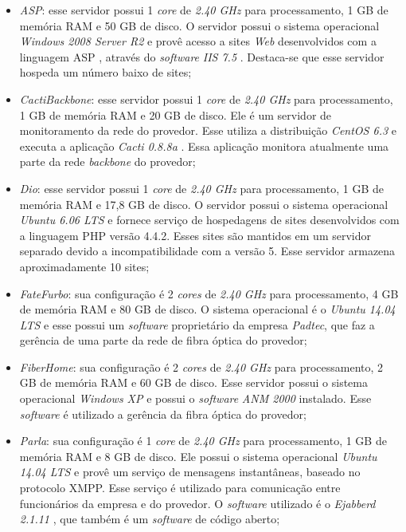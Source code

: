 \begin{itemize}
 \item \textit{ASP}: esse servidor possui 1 \textit{core} de \textit{2.40 GHz} para processamento, 1 GB de memória RAM e 50 GB de disco. 
 O servidor possui o sistema operacional \textit{Windows 2008 Server R2} e provê acesso a sites \textit{Web} desenvolvidos com a linguagem 
 \ac{ASP} \cite{asp}, através do \textit{software} \textit{\ac{IIS} 7.5} \cite{iis}. Destaca-se que esse servidor hospeda um número baixo de sites;
 
 \item \textit{CactiBackbone}: esse servidor possui 1 \textit{core} de \textit{2.40 GHz} para processamento, 1 GB de memória RAM e 20 GB de disco. 
 Ele é um servidor de monitoramento da rede do provedor. Esse utiliza a distribuição \textit{CentOS 6.3} \cite{centos} e executa a aplicação 
 \textit{Cacti 0.8.8a} \cite{cacti}. Essa aplicação monitora atualmente uma parte da rede \textit{backbone} do provedor;
 
 \item \textit{Dio}: esse servidor possui 1 \textit{core} de \textit{2.40 GHz} para processamento, 1 GB de memória RAM e 17,8 GB de disco. 
 O servidor possui o sistema operacional \textit{Ubuntu 6.06 \ac{LTS}} \cite{ubuntu} e fornece serviço de hospedagens de sites desenvolvidos com 
 a linguagem \ac{PHP} versão 4.4.2. Esses sites são mantidos em um servidor separado devido a incompatibilidade com a versão 5. Esse servidor 
 armazena aproximadamente 10 sites;
 
 \item \textit{FateFurbo}: sua configuração é 2 \textit{cores} de \textit{2.40 GHz} para processamento, 4 GB de memória RAM e 80 GB de disco. 
 O sistema operacional é o \textit{Ubuntu 14.04 \ac{LTS}} \cite{ubuntu} e esse possui um \textit{software} proprietário da empresa \textit{Padtec}, 
 que faz a gerência de uma parte da rede de fibra óptica do provedor;
 
 \item \textit{FiberHome}: sua configuração é 2 \textit{cores} de \textit{2.40 GHz} para processamento, 2 GB de memória RAM e 60 GB de disco. 
 Esse servidor possui o sistema operacional \textit{Windows XP} e possui o \textit{software} \textit{ANM 2000} instalado. Esse \textit{software} 
 é utilizado a gerência da fibra óptica do provedor;
 
 \item \textit{Parla}: sua configuração é 1 \textit{core} de \textit{2.40 GHz} para processamento, 1 GB de memória RAM e 8 GB de disco. 
 Ele possui o sistema operacional \textit{Ubuntu 14.04 \ac{LTS}} \cite{ubuntu} e provê um serviço de mensagens instantâneas, baseado no protocolo 
 \ac{XMPP}. Esse serviço é utilizado para comunicação entre funcionários da empresa e do provedor. O \textit{software} utilizado é o 
 \textit{Ejabberd 2.1.11} \cite{ejabberd}, que também é um \textit{software} de código aberto;


\end{itemize}
